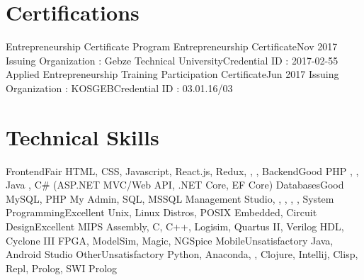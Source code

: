 \documentclass{main} %
\begin{document}
\section{Certifications}
    \resumeSubHeadingListStart
        \resumeSubheading
            {Entrepreneurship Certificate Program Entrepreneurship Certificate}{Nov 2017}
            {Issuing Organization : Gebze Technical University}{Credential ID : 2017-02-55}
        \resumeSubheading
            {Applied Entrepreneurship Training Participation Certificate}{Jun 2017}
            {Issuing Organization : KOSGEB}{Credential ID : 03.01.16/03}
    \resumeSubHeadingListEnd

\section{Technical Skills}
    \resumeSubHeadingListStart %
        \resumeSubheading
            {Frontend}{Fair} %
            {HTML, CSS, Javascript, React.js, Redux, {}, {}, {}}{}
        \resumeSubheading
            {Backend}{Good} %
            {PHP {}, {}, Java {}, C\# (ASP.NET MVC/Web API, .NET Core, EF Core)}{}
        \resumeSubheading
            {Databases}{Good} %
            {MySQL, PHP My Admin, SQL, MSSQL Management Studio, {}, {}, {}, {}, {}}{}
        \resumeSubheading
            {System Programming}{Excellent}
            {Unix, Linux Distros, POSIX}{}
        \resumeSubheading
            {Embedded, Circuit Design}{Excellent}
            {MIPS Assembly, C, C++, Logisim, Quartus II, Verilog HDL, Cyclone III FPGA, ModelSim, Magic, NGSpice}{}
        \resumeSubheading
            {Mobile}{Unsatisfactory}
            {Java, Android Studio}{}
        \resumeSubheading
            {Other}{Unsatisfactory}
            {Python, Anaconda, {}, Clojure, Intellij, Clisp, Repl, Prolog, SWI Prolog}{}
    \resumeSubHeadingListEnd
\end{document}
